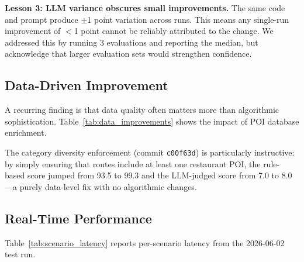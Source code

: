 \textbf{Lesson 3: LLM variance obscures small improvements.} The same code and prompt produce $\pm$1 point variation across runs. This means any single-run improvement of $<$1 point cannot be reliably attributed to the change. We addressed this by running 3 evaluations and reporting the median, but acknowledge that larger evaluation sets would strengthen confidence.

\subsection{Data-Driven Improvement}

A recurring finding is that data quality often matters more than algorithmic sophistication. Table~\ref{tab:data_improvements} shows the impact of POI database enrichment.

\begin{table}[!t]
\centering
\caption{Impact of POI database enrichment on evaluation scores.}
\label{tab:data_improvements}
\end{table}

The category diversity enforcement (commit \texttt{c00f63d}) is particularly instructive: by simply ensuring that routes include at least one restaurant POI, the rule-based score jumped from 93.5 to 99.3 and the LLM-judged score from 7.0 to 8.0---a purely data-level fix with no algorithmic changes.

\subsection{Real-Time Performance}

Table~\ref{tab:scenario_latency} reports per-scenario latency from the 2026-06-02 test run.

